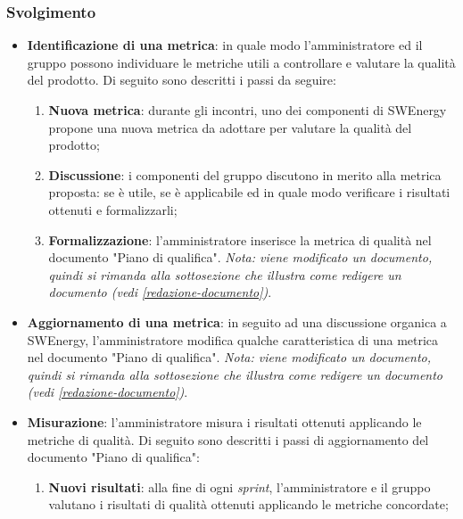 \subsubsection{Svolgimento}
\begin{itemize}
	\item \textbf{Identificazione di una metrica}: in quale modo
	      l'amministratore ed il gruppo possono individuare le metriche utili a
	      controllare e valutare la qualità del prodotto. Di seguito sono
	      descritti i passi da seguire:
	      \begin{enumerate}
		      \item \textbf{Nuova metrica}: durante gli incontri, uno dei
		            componenti di SWEnergy propone una nuova metrica da adottare
		            per valutare la qualità del prodotto;

		      \item \textbf{Discussione}: i componenti del gruppo discutono in
		            merito alla metrica proposta: se è utile, se è applicabile
		            ed in quale modo verificare i risultati ottenuti e
		            formalizzarli;

		      \item \textbf{Formalizzazione}: l'amministratore inserisce la
		            metrica di qualità nel documento "Piano di qualifica".
		            \textit{Nota: viene modificato un documento, quindi si rimanda alla
			            sottosezione che illustra come redigere un documento
			            (vedi \cref{redazione-documento})}.
	      \end{enumerate}

	\item \textbf{Aggiornamento di una metrica}: in seguito ad una discussione
	      organica a SWEnergy, l'amministratore modifica qualche caratteristica
	      di una metrica nel documento "Piano di qualifica". \textit{Nota:
		      viene modificato un documento, quindi si rimanda alla
		      sottosezione che illustra come redigere un documento
		      (vedi \cref{redazione-documento})}.

	\item \textbf{Misurazione}: l'amministratore misura i risultati ottenuti
	      applicando le metriche di qualità. Di seguito sono descritti i passi
	      di aggiornamento del documento "Piano di qualifica":
	      \begin{enumerate}
		      \item \textbf{Nuovi risultati}: alla fine di ogni \textit{sprint},
		            l'amministratore e il gruppo valutano i risultati di qualità
		            ottenuti applicando le metriche concordate;


\end{enumerate}
\end{itemize}
